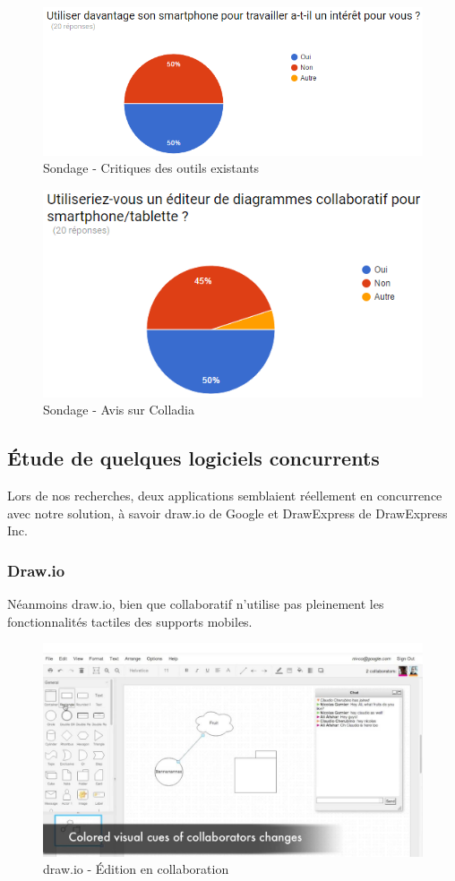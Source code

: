 \vspace*{\fill}
\begin{figure}[!h]
	\centering
	\includegraphics[width=.8\textwidth]{img/sondage_smartphone}
	\caption{Sondage - Critiques des outils existants}
\end{figure}

\vspace*{\fill}
\begin{figure}[h]
	\centering
	\includegraphics[width=.7\textwidth]{img/sondage_colladia}
	\caption{Sondage - Avis sur Colladia}
\end{figure}
\vspace*{\fill}

\newpage
\subsection{Étude de quelques logiciels concurrents}
Lors de nos recherches, deux applications semblaient réellement en concurrence avec notre solution, à savoir draw.io de Google et DrawExpress de DrawExpress Inc.

\subsubsection{Draw.io}
Néanmoins draw.io, bien que collaboratif n'utilise pas pleinement les fonctionnalités tactiles des supports mobiles.

\vspace*{\fill}
\begin{figure}[h]
	\centering
	\includegraphics[width=.6\textwidth]{img/drawio}
	\caption{draw.io - Édition en collaboration}
\end{figure}
\vspace*{\fill}


